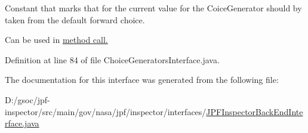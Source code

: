 Constant that marks that for the current value for the Coice\+Generator should by taken from the default forward choice. 

Can be used in \hyperlink{interfacegov_1_1nasa_1_1jpf_1_1inspector_1_1interfaces_1_1_choice_generators_interface_a055b8d48f863633614dee147bc607ed7}{method call. }

Definition at line 84 of file Choice\+Generators\+Interface.\+java.



The documentation for this interface was generated from the following file\+:\begin{DoxyCompactItemize}
\item 
D\+:/gsoc/jpf-\/inspector/src/main/gov/nasa/jpf/inspector/interfaces/\hyperlink{_j_p_f_inspector_back_end_interface_8java}{J\+P\+F\+Inspector\+Back\+End\+Interface.\+java}\end{DoxyCompactItemize}
